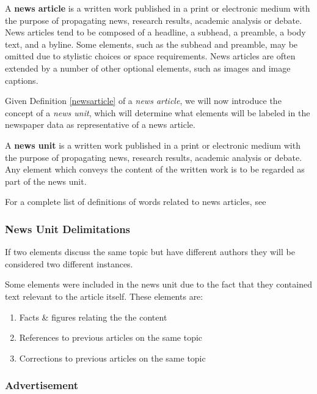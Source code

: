 \documentclass[oneside, english, bibtex]{kththesis}
\begin{document}
\begin{definition}
\label{newsarticle}
A \textbf{news article} is a written work published in a print or electronic medium with the purpose of propagating news, research results, academic analysis or debate.
News articles tend to be composed of a headline, a subhead, a preamble, a body text, and a byline.
Some elements, such as the subhead and preamble, may be omitted due to stylistic choices or space requirements.
News articles are often extended by a number of other optional elements, such as images and image captions.
\end{definition}


Given Definition \ref{newsarticle} of a \textit{news article}, we will now introduce the concept of a \textit{news unit}, which will determine what elements will be labeled in the newspaper data as representative of a news article.

\begin{definition}
\label{newsunit}
A \textbf{news unit} is a written work published in a print or electronic medium with the purpose of propagating news, research results, academic analysis or debate. Any element which conveys the content of the written work is to be regarded as part of the news unit.
\end{definition}

For a complete list of definitions of words related to news articles, see ~

\subsubsection{News Unit Delimitations}

If two elements discuss the same topic but have different authors they will be considered two different instances.

Some elements were included in the news unit due to the fact that they contained text relevant to the article itself. These elements are:

\begin{enumerate}
\item Facts \& figures relating the the content
\item References to previous articles on the same topic
\item Corrections to previous articles on the same topic
\end{enumerate}

\subsubsection{Advertisement}
\end{document}
